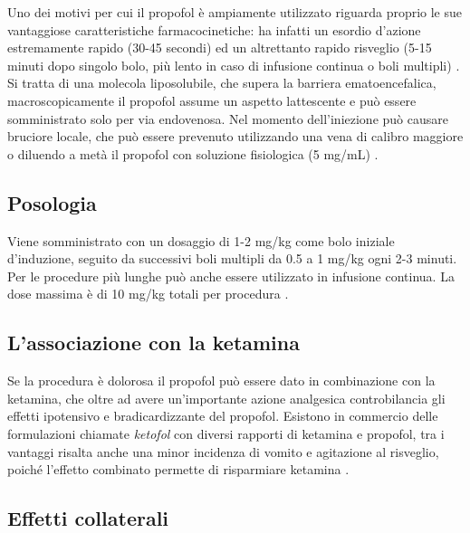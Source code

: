 Uno dei motivi per cui il propofol è ampiamente utilizzato riguarda proprio le sue vantaggiose caratteristiche farmacocinetiche: ha infatti un esordio d'azione estremamente rapido (30-45 secondi) ed un altrettanto rapido risveglio (5-15 minuti dopo singolo bolo, più lento in caso di infusione continua o boli multipli) \cite{Simeupsedazione, Uptodatepharmacology}. Si tratta di una molecola liposolubile, che supera la barriera ematoencefalica, macroscopicamente il propofol assume un aspetto lattescente e può essere somministrato solo per via endovenosa. Nel momento dell'iniezione può causare bruciore locale, che può essere prevenuto utilizzando una vena di calibro maggiore o diluendo a metà il propofol con soluzione fisiologica (5 mg/mL) \cite{Simeupsedazione}. 

\subsection*{Posologia}

Viene somministrato con un dosaggio di 1-2 mg/kg come bolo iniziale d'induzione, seguito da successivi boli multipli da 0.5 a 1 mg/kg ogni 2-3 minuti. Per le procedure più lunghe può anche essere utilizzato in infusione continua.
La dose massima è di 10 mg/kg totali per procedura \cite{Simeupsedazione}.

\subsection*{L'associazione con la ketamina}

Se la procedura è dolorosa il propofol può essere dato in combinazione con la ketamina, che oltre ad avere un'importante azione analgesica controbilancia gli effetti ipotensivo e bradicardizzante del propofol. Esistono in commercio delle formulazioni chiamate \emph{ketofol} con diversi rapporti di ketamina e propofol, tra i vantaggi risalta anche una minor incidenza di vomito e agitazione al risveglio, poiché l'effetto combinato permette di risparmiare ketamina \cite{Simeupsedazione}.

\subsection*{Effetti collaterali}

